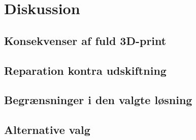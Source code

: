 \chapter{Diskussion}
\label{ch:diskussion}


\section{Konsekvenser af fuld 3D-print}

\section{Reparation kontra udskiftning}

\section{Begrænsninger i den valgte løsning}

\section{Alternative valg}
